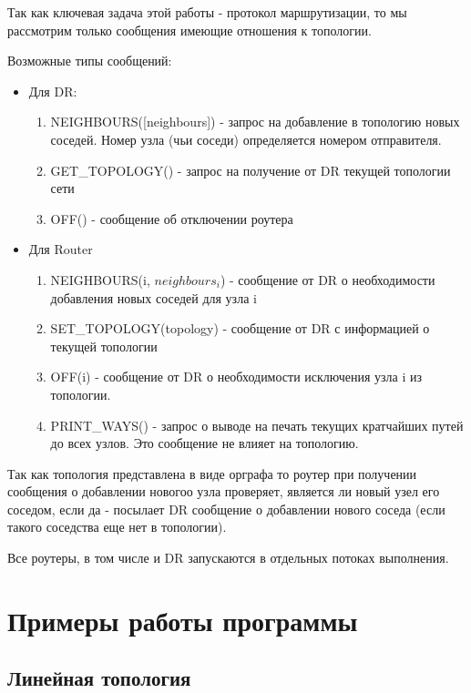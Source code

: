 \documentclass[a4paper,12pt]{article}
\begin{document}
Так как ключевая задача этой работы - протокол маршрутизации, то мы рассмотрим
только сообщения имеющие отношения к топологии.

Возможные типы сообщений:
\begin{itemize}
    \item Для DR:
        \begin{enumerate}
            \item NEIGHBOURS([neighbours]) - запрос на добавление в топологию
                новых соседей. Номер узла (чьи соседи) определяется номером
                отправителя.
            \item GET\_TOPOLOGY() - запрос на получение от DR текущей топологии
                сети
            \item OFF() - сообщение об отключении роутера
        \end{enumerate}
    \item Для Router
        \begin{enumerate}
            \item NEIGHBOURS(i, $neighbours_i$) - сообщение от DR о
                необходимости добавления новых соседей для узла i
            \item SET\_TOPOLOGY(topology) - сообщение от DR с информацией о
                текущей топологии
            \item OFF(i) - сообщение от DR о необходимости исключения узла i 
                из топологии.
            \item PRINT\_WAYS() - запрос о выводе на печать текущих кратчайших 
                путей до всех узлов. Это сообщение не влияет на топологию.
        \end{enumerate}
\end{itemize}

Так как топология представлена в виде орграфа то роутер при получении сообщения
о добавлении новогоо узла проверяет, является ли новый узел его соседом, если 
да - посылает DR сообщение о добавлении нового соседа (если такого соседства
еще нет в топологии).

Все роутеры, в том числе и DR запускаются в отдельных потоках выполнения.

\section{Примеры работы программы}

\subsection{Линейная топология}
\end{document}
